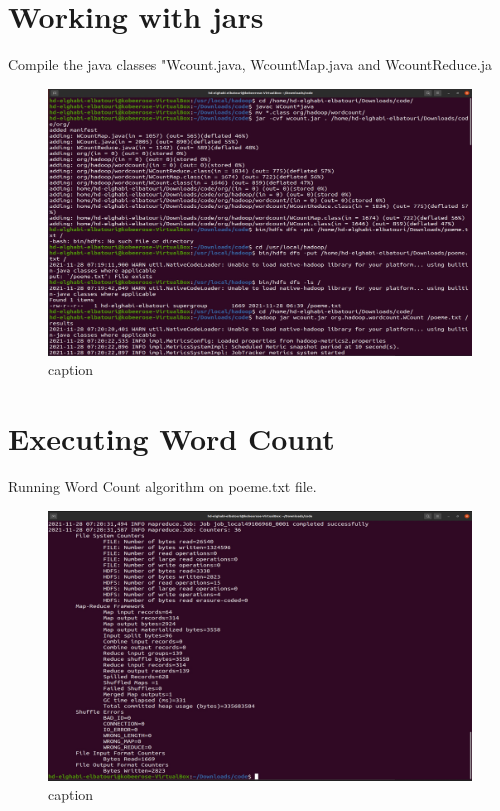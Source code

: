 \begin{spacing}{1.2}
\section{Working with jars}

\par Compile the java classes "Wcount.java, WcountMap.java and WcountReduce.ja
\\
\begin{figure}[!htb] 
\begin{center} 
\includegraphics[width=1\linewidth]{Big_Data/Hadoop/1-Node Map_Reduce/Compiling jars.jpg} 
\end{center} 
\caption{caption} 
\end{figure} 
\FloatBarrier

\section{Executing Word Count}

\par Running Word Count algorithm on poeme.txt file.
\\
\begin{figure}[!htb] 
\begin{center} 
\includegraphics[width=1\linewidth]{Big_Data/Hadoop/1-Node Map_Reduce/running wordcount.jpg} 
\end{center} 
\caption{caption} 
\end{figure} 
\FloatBarrier


\end{spacing}
